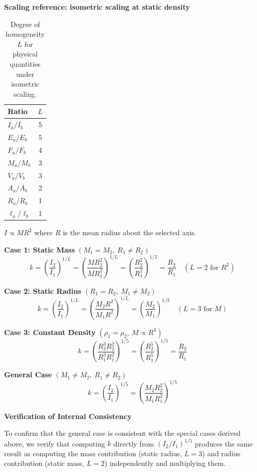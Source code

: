 \documentclass[a4paper,11pt]{article}
\begin{document}
\textbf{Scaling reference: isometric scaling at static density}

\begin{table}[H]
\centering
\caption{Degree of homogeneity $L$ for physical quantities under isometric scaling.}
\begin{tabular}{lc}
\toprule
Ratio & $L$ \\
\midrule
$I_a/I_b$ & 5 \\
$E_a/E_b$ & 5 \\
$F_a/F_b$ & 4 \\
$M_a/M_b$ & 3 \\
$V_a/V_b$ & 3 \\
$A_a/A_b$ & 2 \\
$R_a/R_b$ & 1 \\
$\ell_a/\ell_b$ & 1 \\
\bottomrule
\end{tabular}
\end{table}

$I \propto MR^2$ where $R$ is the mean radius about the selected axis.

\textbf{Case 1: Static Mass} $(M_1 = M_2,\ R_1 \neq R_2)$
\begin{equation}
k = \left(\frac{I_2}{I_1}\right)^{1/L} = \left(\frac{M R_2^2}{M R_1^2}\right)^{1/L} = \left(\frac{R_2^2}{R_1^2}\right)^{1/2} = \frac{R_2}{R_1} \quad (L = 2 \text{ for } R^2)
\end{equation}

\textbf{Case 2: Static Radius} $(R_1 = R_2,\ M_1 \neq M_2)$
\begin{equation}
k = \left(\frac{I_2}{I_1}\right)^{1/L} = \left(\frac{M_2 R^2}{M_1 R^2}\right)^{1/L} = \left(\frac{M_2}{M_1}\right)^{1/3} \quad (L = 3 \text{ for } M)
\end{equation}

\textbf{Case 3: Constant Density} $(\rho_1 = \rho_2,\ M \propto R^3)$
\begin{equation}
k = \left(\frac{R_2^3 R_2^2}{R_1^3 R_1^2}\right)^{1/5} = \left(\frac{R_2^5}{R_1^5}\right)^{1/5} = \frac{R_2}{R_1}
\end{equation}

\textbf{General Case} $(M_1 \neq M_2,\ R_1 \neq R_2)$
\begin{equation}
k = \left(\frac{I_2}{I_1}\right)^{1/5} = \left(\frac{M_2 R_2^2}{M_1 R_1^2}\right)^{1/5}
\end{equation}

\textbf{Verification of Internal Consistency}

To confirm that the general case is consistent with the special cases derived above, we verify that computing $k$ directly from $(I_2/I_1)^{1/5}$ produces the same result as computing the mass contribution (static radius, $L=3$) and radius contribution (static mass, $L=2$) independently and multiplying them.
\end{document}
